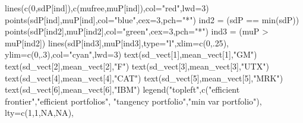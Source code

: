 \documentclass[
  oneside]{book}
\newenvironment{Shaded}{\begin{snugshade}}{\end{snugshade}}
\newcommand{\AttributeTok}[1]{\textcolor[rgb]{0.77,0.63,0.00}{#1}}
\newcommand{\ConstantTok}[1]{\textcolor[rgb]{0.00,0.00,0.00}{#1}}
\newcommand{\DecValTok}[1]{\textcolor[rgb]{0.00,0.00,0.81}{#1}}
\newcommand{\FunctionTok}[1]{\textcolor[rgb]{0.00,0.00,0.00}{#1}}
\newcommand{\NormalTok}[1]{#1}
\newcommand{\OtherTok}[1]{\textcolor[rgb]{0.56,0.35,0.01}{#1}}
\newcommand{\SpecialCharTok}[1]{\textcolor[rgb]{0.00,0.00,0.00}{#1}}
\newcommand{\StringTok}[1]{\textcolor[rgb]{0.31,0.60,0.02}{#1}}
\begin{document}
\begin{Shaded}
\begin{Highlighting}[]
\FunctionTok{lines}\NormalTok{(}\FunctionTok{c}\NormalTok{(}\DecValTok{0}\NormalTok{,sdP[ind]),}\FunctionTok{c}\NormalTok{(mufree,muP[ind]),}\AttributeTok{col=}\StringTok{"red"}\NormalTok{,}\AttributeTok{lwd=}\DecValTok{3}\NormalTok{)}
\FunctionTok{points}\NormalTok{(sdP[ind],muP[ind],}\AttributeTok{col=}\StringTok{"blue"}\NormalTok{,}\AttributeTok{cex=}\DecValTok{3}\NormalTok{,}\AttributeTok{pch=}\StringTok{"*"}\NormalTok{)}
\NormalTok{ind2 }\OtherTok{=}\NormalTok{ (sdP }\SpecialCharTok{==} \FunctionTok{min}\NormalTok{(sdP))}
\FunctionTok{points}\NormalTok{(sdP[ind2],muP[ind2],}\AttributeTok{col=}\StringTok{"green"}\NormalTok{,}\AttributeTok{cex=}\DecValTok{3}\NormalTok{,}\AttributeTok{pch=}\StringTok{"*"}\NormalTok{)}
\NormalTok{ind3 }\OtherTok{=}\NormalTok{ (muP }\SpecialCharTok{\textgreater{}}\NormalTok{ muP[ind2])}
\FunctionTok{lines}\NormalTok{(sdP[ind3],muP[ind3],}\AttributeTok{type=}\StringTok{"l"}\NormalTok{,}\AttributeTok{xlim=}\FunctionTok{c}\NormalTok{(}\DecValTok{0}\NormalTok{,.}\DecValTok{25}\NormalTok{),}
\AttributeTok{ylim=}\FunctionTok{c}\NormalTok{(}\DecValTok{0}\NormalTok{,.}\DecValTok{3}\NormalTok{),}\AttributeTok{col=}\StringTok{"cyan"}\NormalTok{,}\AttributeTok{lwd=}\DecValTok{3}\NormalTok{)}
\FunctionTok{text}\NormalTok{(sd\_vect[}\DecValTok{1}\NormalTok{],mean\_vect[}\DecValTok{1}\NormalTok{],}\StringTok{"GM"}\NormalTok{)}
\FunctionTok{text}\NormalTok{(sd\_vect[}\DecValTok{2}\NormalTok{],mean\_vect[}\DecValTok{2}\NormalTok{],}\StringTok{"F"}\NormalTok{)}
\FunctionTok{text}\NormalTok{(sd\_vect[}\DecValTok{3}\NormalTok{],mean\_vect[}\DecValTok{3}\NormalTok{],}\StringTok{"UTX"}\NormalTok{)}
\FunctionTok{text}\NormalTok{(sd\_vect[}\DecValTok{4}\NormalTok{],mean\_vect[}\DecValTok{4}\NormalTok{],}\StringTok{"CAT"}\NormalTok{)}
\FunctionTok{text}\NormalTok{(sd\_vect[}\DecValTok{5}\NormalTok{],mean\_vect[}\DecValTok{5}\NormalTok{],}\StringTok{"MRK"}\NormalTok{)}
\FunctionTok{text}\NormalTok{(sd\_vect[}\DecValTok{6}\NormalTok{],mean\_vect[}\DecValTok{6}\NormalTok{],}\StringTok{"IBM"}\NormalTok{)}
\FunctionTok{legend}\NormalTok{(}\StringTok{"topleft"}\NormalTok{,}\FunctionTok{c}\NormalTok{(}\StringTok{"efficient frontier"}\NormalTok{,}\StringTok{"efficient portfolios"}\NormalTok{, }
                   \StringTok{"tangency portfolio"}\NormalTok{,}\StringTok{"min var portfolio"}\NormalTok{),}
       \AttributeTok{lty=}\FunctionTok{c}\NormalTok{(}\DecValTok{1}\NormalTok{,}\DecValTok{1}\NormalTok{,}\ConstantTok{NA}\NormalTok{,}\ConstantTok{NA}\NormalTok{),}

\end{Highlighting}
\end{Shaded}
\end{document}

